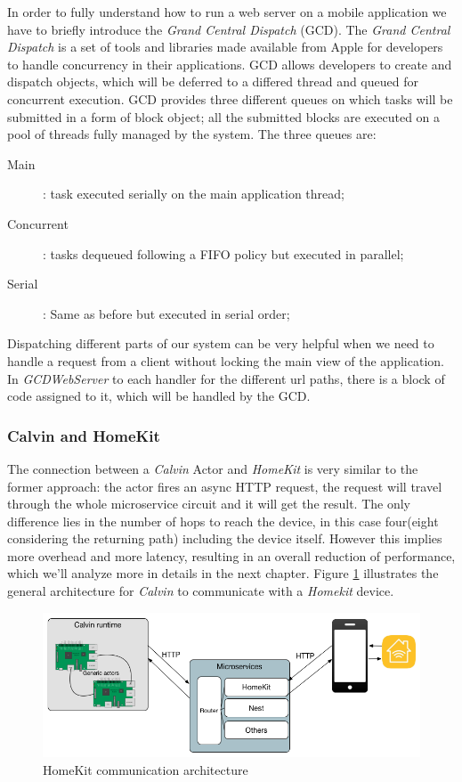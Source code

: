 In order to fully understand how to run a web server on a mobile application we
have to briefly introduce the \textit{Grand Central Dispatch} (GCD).
The \textit{Grand Central Dispatch} is a set of tools and libraries made available from
Apple for developers to handle concurrency in their applications.\cite{gcd} GCD allows
developers to create and dispatch objects, which will be deferred to a differed thread
and queued for concurrent execution.\newline
GCD provides three different queues on which tasks will be submitted in a form of block object;
all the submitted blocks are executed on a pool of threads fully managed by the system. The three
queues are:%

\begin{description}
    \item[Main]: task executed serially on the main application thread;
    \item[Concurrent]: tasks dequeued following a FIFO policy but executed in parallel;
    \item[Serial]: Same as before but executed in serial order;
\end{description}

Dispatching different parts of our system can be very helpful when we need to handle
a request from a client without locking the main view of the application. In \textit{GCDWebServer}
to each handler for the different url paths, there is a block of code assigned to it,
which will be handled by the GCD.


\subsubsection{Calvin and HomeKit}

The connection between a \textit{Calvin} Actor and \textit{HomeKit} is very similar
to the former approach: the actor fires an async HTTP request, the request will travel
through the whole microservice circuit and it will get the result. \newline
The only difference lies in the number of hops to reach the device, in this case
four(eight considering the returning path) including the device itself. However this
implies more overhead and more latency, resulting in an overall reduction of performance,
which we'll analyze more in details in the next chapter.
Figure \ref{fig:arch-homekit} illustrates the general architecture for \textit{Calvin}
to communicate with a \textit{Homekit} device.
\begin{figure}[h]
\caption{HomeKit communication architecture}
\label{fig:arch-homekit}
\centering
\includegraphics[scale=0.5]{arch2.png}
\end{figure}

